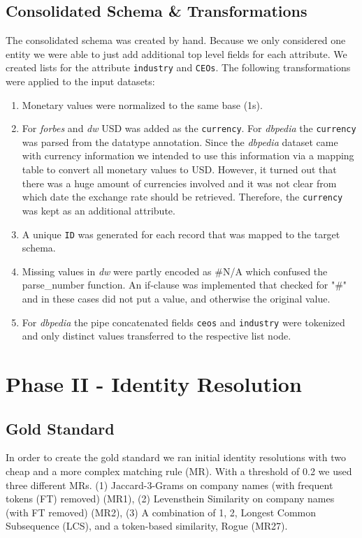 \documentclass[11pt,titlepage,oneside,openany]{article}
\begin{document}
\subsection{Consolidated Schema \& Transformations}

The consolidated schema was created by hand. Because we only considered one entity we were able to just add additional top level fields for each attribute. We created lists for the attribute {\tt industry} and {\tt CEOs}. The following transformations were applied to the input datasets:\begin{enumerate}
	\item Monetary values were normalized to the same base (1s).
	\item For \textit{forbes} and \textit{dw} USD was added as the {\tt currency}. For \textit{dbpedia} the {\tt currency} was parsed from the datatype annotation. Since the \textit{dbpedia} dataset came with currency information we intended to use this information via a mapping table to convert all monetary values to USD. However, it turned out that there was a huge amount of currencies involved and it was not clear from which date the exchange rate should be retrieved. Therefore, the {\tt currency} was kept as an additional attribute.
	\item A unique {\tt ID} was generated for each record that was mapped to the target schema.
	\item Missing values in \textit{dw} were partly encoded as \#N/A which confused the parse\_number function. An if-clause was implemented that checked for "\#" and in these cases did not put a value, and otherwise the original value.
	\item For \textit{dbpedia} the pipe concatenated fields {\tt ceos} and {\tt industry} were tokenized and only distinct values transferred to the respective list node.
\end{enumerate} 




\section{Phase II - Identity Resolution}

\subsection{Gold Standard}
\label{sec:gold-standard-IR}

In order to create the gold standard we ran initial identity resolutions with two cheap and a more complex matching rule (MR). With a threshold of 0.2 we used three different MRs. (1) Jaccard-3-Grams on company names (with frequent tokens (FT) removed) (MR1), (2) Levensthein Similarity on company names (with FT removed) (MR2), (3) A combination of 1, 2, Longest Common Subsequence (LCS), and a token-based similarity, Rogue (MR27).
\end{document}
